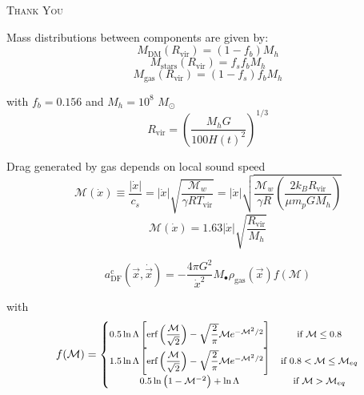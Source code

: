 \documentclass{beamer}
\newcommand{\sm}[0]{$M_\odot$}
\newcommand{\erf}[1]{\text{erf}\left(#1\right)}
\begin{document}
\begin{frame}
	\begin{center}
		\scshape\huge
		Thank You
	\end{center}
\end{frame}

%
%
%
%
%
%
%
%
%
%
%
%
%
%
%
%
%
%
%
%

\begin{frame}
	Mass distributions between components are given by:
	\begin{equation}
		M_\text{DM}(R_\text{vir}) = (1 - f_b)M_h
	\end{equation}
	\begin{equation}
		M_\text{stars}(R_\text{vir}) = f_sf_bM_h
	\end{equation}
	\begin{equation}
		M_\text{gas}(R_\text{vir}) = (1 - f_s)f_bM_h
	\end{equation}
	
	with $f_b = 0.156$ and $M_h = 10^8$ \sm
	\begin{equation}
		R_\text{vir} = \left({\dfrac{M_hG}{100 H(t)^2}}\right)^{1/3}
	\end{equation}
\end{frame}

\begin{frame}
	Drag generated by gas depends on local sound speed
	\begin{equation}
		\mathcal{M}(\dot{x}) \equiv \dfrac{|\dot{x}|}{c_s} = |\dot{x}|\sqrt{\dfrac{\mathcal{M}_w}{\gamma RT_\text{vir}}} = |\dot{x}|\sqrt{\dfrac{\mathcal{M}_w}{\gamma R}\left(\dfrac{2k_BR_\text{vir}}{\mu m_p G M_h}\right)}
	\end{equation}
	\begin{equation*}
		\mathcal{M}(\dot{x}) = 1.63|\dot{x}|\sqrt{\dfrac{R_\text{vir}}{M_h}}
	\end{equation*}
	
	\begin{equation}\label{eq: df_c}
	a^\text{c}_\text{DF}(\vec{x}, \dot{\vec{x}}) = -\dfrac{4\pi G^2}{\dot{x}^2}M_\bullet\rho_\text{gas}(\vec{x})f(\mathcal{M})
	\end{equation}
	
	with
	\begin{equation}\footnotesize
	f(\mathcal{M}) = \left\{
	\begin{matrix}
	0.5\ln\Lambda \left[\erf{\dfrac{\mathcal{M}}{\sqrt{2}}} - \sqrt{\dfrac{2}{\pi}}\mathcal{M}e^{-\mathcal{M}^2/2}\right]& \text{if $\mathcal{M} \leq 0.8$}\\
	1.5\ln\Lambda \left[\erf{\dfrac{\mathcal{M}}{\sqrt{2}}} - \sqrt{\dfrac{2}{\pi}}\mathcal{M}e^{-\mathcal{M}^2/2}\right] & \text{if $0.8 < \mathcal{M} \leq \mathcal{M}_{eq}$}\\
	0.5\ln\left(1 - \mathcal{M}^{-2}\right) + \ln\Lambda & \text{if $\mathcal{M} > \mathcal{M}_{eq}$}
	\end{matrix}
	\right.
	\end{equation}
\end{frame}
\end{document}
